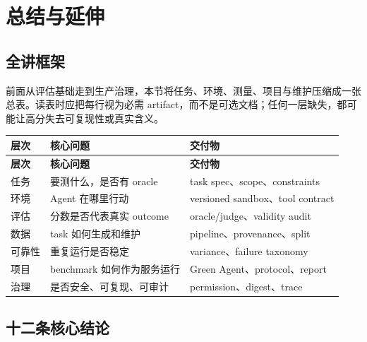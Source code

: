 \section{总结与延伸}

\subsection{全讲框架}

前面从评估基础走到生产治理，本节将任务、环境、测量、项目与维护压缩成一张总表。读表时应把每行视为必需 artifact，而不是可选文档；任何一层缺失，都可能让高分失去可复现性或真实含义。

\begin{longtable}{p{2.7cm}p{4.3cm}p{4.1cm}}
\toprule
\textbf{层次} & \textbf{核心问题} & \textbf{交付物} \\
\midrule
\endfirsthead
\toprule
\textbf{层次} & \textbf{核心问题} & \textbf{交付物} \\
\midrule
\endhead
任务 & 要测什么，是否有 oracle & task spec、scope、constraints \\
环境 & Agent 在哪里行动 & versioned sandbox、tool contract \\
评估 & 分数是否代表真实 outcome & oracle/judge、validity audit \\
数据 & task 如何生成和维护 & pipeline、provenance、split \\
可靠性 & 重复运行是否稳定 & variance、failure taxonomy \\
项目 & benchmark 如何作为服务运行 & Green Agent、protocol、report \\
治理 & 是否安全、可复现、可审计 & permission、digest、trace \\
\bottomrule
\end{longtable}

\subsection{十二条核心结论}

